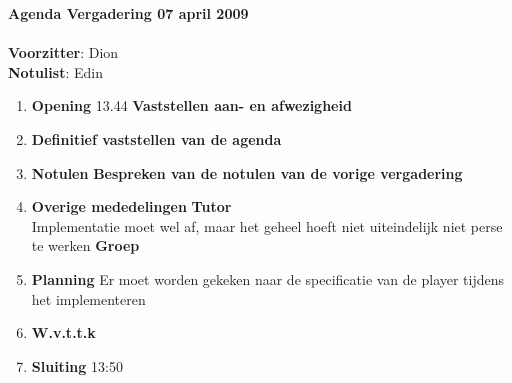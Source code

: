 \documentclass[11pt,oneside,a4paper]{article}
\begin{document}
\textbf{{\LARGE{Agenda Vergadering 07 april 2009}}}\\ \\
\textbf{Voorzitter}: Dion\\
\textbf{Notulist}: Edin\\
\begin{enumerate}
    \item \textbf{Opening} 13.44
        \subitem \textbf{Vaststellen aan- en afwezigheid}
    \item \textbf{Definitief vaststellen van de agenda}
    \item \textbf{Notulen}
        \subitem \textbf{Bespreken van de notulen van de vorige vergadering}
    \item \textbf{Overige mededelingen}
        \subitem \textbf{Tutor} \\
            Implementatie moet wel af, maar het geheel hoeft niet uiteindelijk niet perse te werken
        \subitem \textbf{Groep}
    \item \textbf{Planning}
        \subitem \textbf{} Er moet worden gekeken naar de specificatie van de player tijdens het implementeren
    \item \textbf{W.v.t.t.k}
    \item \textbf{Sluiting} 13:50
\end{enumerate}
\end{document}

